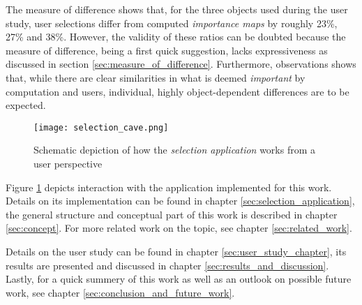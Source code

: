 The measure of difference shows that, for the three objects used during the user study, user selections differ from computed \textit{importance maps} by roughly 23\%, 27\% and 38\%. However, the validity of these ratios can be doubted because the measure of difference, being a first quick suggestion, lacks expressiveness as discussed in section \ref{sec:measure_of_difference}. Furthermore, observations shows that, while there are clear similarities in what is deemed \textit{important} by computation and users, individual, highly object-dependent differences are to be expected.

\begin{figure}[htb]
  \centering
  \texttt{[image: selection\_cave.png]}
  \caption{Schematic depiction of how the \textit{selection application} works from a user perspective}
  \label{fig:intro_pic}
\end{figure}

Figure \ref{fig:intro_pic} depicts interaction with the application implemented for this work. Details on its implementation can be found in chapter \ref{sec:selection_application}, the general structure and conceptual part of this work is described in chapter \ref{sec:concept}. For more related work on the topic, see chapter \ref{sec:related_work}.

Details on the user study can be found in chapter \ref{sec:user_study_chapter}, its results are presented and discussed in chapter \ref{sec:results_and_discussion}. Lastly, for a quick summery of this work as well as an outlook on possible future work, see chapter \ref{sec:conclusion_and_future_work}.

